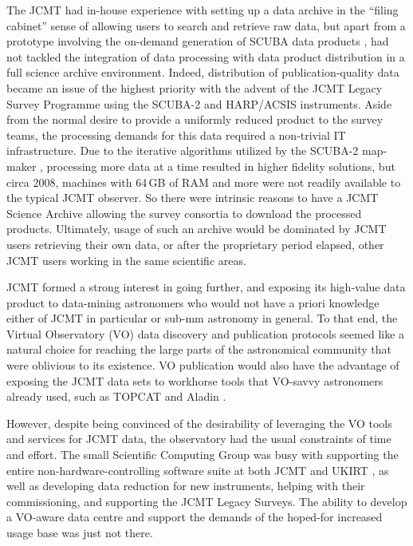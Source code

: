 \documentclass[final,authoryear,5p,times,twocolumn]{elsarticle}
\begin{document}
The JCMT had in-house experience with setting up a data archive in the
``filing cabinet'' sense of allowing users to search and retrieve raw
data, but apart from a prototype involving the on-demand generation
of SCUBA data products \citep{2002ASPC..281..243J}, had not tackled
the integration of data processing with data
product distribution in a full science archive environment.
Indeed, distribution of publication-quality data became an issue of
the highest priority with the advent of the JCMT Legacy Survey
Programme \citep{2010HiA....15..797C,2008ASPC..394..450E} using the
SCUBA-2 and HARP/ACSIS \citep{2009MNRAS.399.1026B} instruments. Aside
from the normal desire to provide a uniformly reduced product to the
survey teams, the processing demands for this data required a
non-trivial IT infrastructure. Due to the iterative algorithms
utilized by the SCUBA-2 map-maker
\citep[SMURF;][]{2013MNRAS.430.2545C}, processing more data at a time  resulted in higher fidelity solutions, but circa 2008,
machines with 64\,GB of RAM and more were not readily
available to the typical JCMT observer. So there were intrinsic
reasons to have a JCMT Science Archive allowing the survey consortia
to download the processed products. Ultimately, usage of such an
archive would be dominated by JCMT users retrieving their own data, or
after the proprietary period elapsed, other JCMT users working in the
same scientific areas.

JCMT formed a strong interest in going further, and exposing its
high-value data product to data-mining astronomers who would not have
a priori knowledge either of JCMT in particular or sub-mm astronomy in
general. To that end, the Virtual Observatory (VO) data discovery and publication protocols
seemed like a natural choice for reaching the large parts of the
astronomical community that were oblivious to its existence. VO
publication would also have the advantage of exposing the JCMT data
sets to workhorse tools that VO-savvy astronomers already used, such
as TOPCAT \citep[][]{2005ASPC..347...29T} and Aladin
\citep[][]{2005ASPC..347..193O}.

However, despite being convinced of the desirability of
leveraging the VO tools and services for JCMT data, the observatory
had the usual constraints of time and effort. The small Scientific
Computing Group was busy with supporting the entire non-hardware-controlling
software suite at both JCMT and UKIRT \citep[see e.g.,][with both
telescopes operated by the same organization]{2002SPIE.4844..321E,2011tfa..confE..42J},
as well as developing data reduction for new instruments, helping with
their commissioning,
and supporting the JCMT Legacy Surveys. The ability to develop a
VO-aware data centre and support the demands of the hoped-for
increased usage base was just not there.
\end{document}
